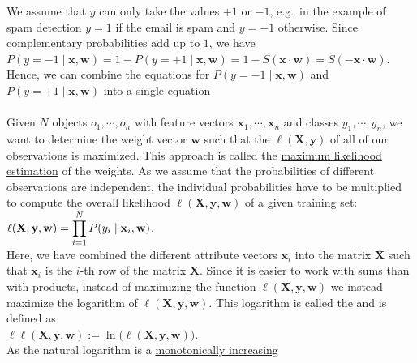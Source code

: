 We assume that $y$ can only take the values $+1$ or $-1$,  e.g.~in the example of spam detection $y = 1$ if the
email is spam and $y = -1$ otherwise.  Since complementary probabilities add up to $1$, we have
\\[0.2cm]
\hspace*{1.3cm}
$P(y=-1\;|\;\mathbf{x},\mathbf{w}) = 1 - P(y=+1\;|\;\mathbf{x},\mathbf{w}) 
  = 1 - S(\mathbf{x} \cdot \mathbf{w}) = S(-\mathbf{x} \cdot \mathbf{w})
$.
\\[0.2cm]
Hence, we can combine the equations for $P(y=-1\;|\;\mathbf{x},\mathbf{w})$ and $P(y=+1\;|\;\mathbf{x},\mathbf{w})$ into a
single equation
\\[0.2cm]
\hspace*{1.3cm}
\colorbox{red}{}
\\[0.2cm]
Given $N$ objects $o_1, \cdots, o_n $ with feature vectors $\mathbf{x}_1, \cdots, \mathbf{x}_n$ and classes
$y_1,\cdots,y_n$, we
want to determine the weight vector $\mathbf{w}$ such that the  $\ell(\mathbf{X}, \mathbf{y})$ of all of our
observations is maximized.  This approach is called the 
\href{https://en.wikipedia.org/wiki/Maximum_likelihood_estimation}{maximum likelihood estimation} of the weights.
As we assume that the probabilities of different observations are independent, the individual
probabilities have to be multiplied to compute the overall likelihood $\ell(\mathbf{X}, \mathbf{y},\mathbf{w})$ 
of a given training set:
\\[0.2cm]
\hspace*{1.3cm}
$\displaystyle \ell(\mathbf{X},\mathbf{y},\mathbf{w}) = \prod\limits_{i=1}^N P(y_i \;|\;\mathbf{x}_i,\mathbf{w})$.
\\[0.2cm]
Here, we have combined the different attribute vectors $\mathbf{x}_i$ into the matrix $\mathbf{X}$ such that
$\mathbf{x}_i$ is the $i$-th row of the matrix $\mathbf{X}$.  Since it is
easier to work with sums than with products, instead of maximizing the function
$\ell(\mathbf{X},\mathbf{y},\mathbf{w})$ we instead maximize the logarithm of
$\ell(\mathbf{X},\mathbf{y},\mathbf{w})$.  This logarithm is called the  and is defined as 
\\[0.2cm]
\hspace*{1.3cm}
$\ell\ell(\mathbf{X},\mathbf{y},\mathbf{w}) := \ln\bigl(\ell(\mathbf{X},\mathbf{y},\mathbf{w})\bigr)$. 
\\[0.2cm]
As the natural logarithm is a \href{https://en.wikipedia.org/wiki/Monotonic_function}{monotonically increasing}
